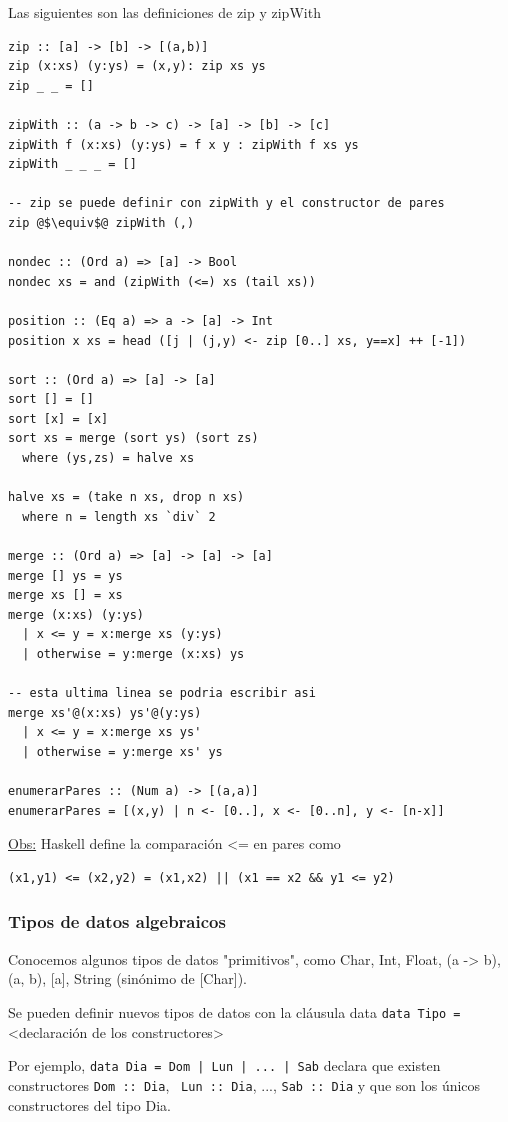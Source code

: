 \documentclass[12pt]{extarticle}
\def\observacion{\underline{Obs:} }
\newcommand\hsline[1]{\texttt{#1}}
\begin{document}
Las siguientes son las definiciones de zip y zipWith
\begin{verbatim}
zip :: [a] -> [b] -> [(a,b)]
zip (x:xs) (y:ys) = (x,y): zip xs ys
zip _ _ = []

zipWith :: (a -> b -> c) -> [a] -> [b] -> [c]
zipWith f (x:xs) (y:ys) = f x y : zipWith f xs ys
zipWith _ _ _ = []

-- zip se puede definir con zipWith y el constructor de pares
zip @$\equiv$@ zipWith (,)

nondec :: (Ord a) => [a] -> Bool
nondec xs = and (zipWith (<=) xs (tail xs))

position :: (Eq a) => a -> [a] -> Int
position x xs = head ([j | (j,y) <- zip [0..] xs, y==x] ++ [-1])

sort :: (Ord a) => [a] -> [a]
sort [] = []
sort [x] = [x]
sort xs = merge (sort ys) (sort zs)
  where (ys,zs) = halve xs

halve xs = (take n xs, drop n xs)
  where n = length xs `div` 2

merge :: (Ord a) => [a] -> [a] -> [a]
merge [] ys = ys
merge xs [] = xs
merge (x:xs) (y:ys)
  | x <= y = x:merge xs (y:ys)
  | otherwise = y:merge (x:xs) ys

-- esta ultima linea se podria escribir asi
merge xs'@(x:xs) ys'@(y:ys)
  | x <= y = x:merge xs ys'
  | otherwise = y:merge xs' ys

enumerarPares :: (Num a) -> [(a,a)]
enumerarPares = [(x,y) | n <- [0..], x <- [0..n], y <- [n-x]]
\end{verbatim}

\observacion Haskell define la comparación <= en pares como 
\begin{verbatim}
(x1,y1) <= (x2,y2) = (x1,x2) || (x1 == x2 && y1 <= y2)
\end{verbatim}

\subsubsection{Tipos de datos algebraicos}

Conocemos algunos tipos de datos "primitivos", como Char, Int, Float, (a -> b), (a, b), [a], String (sinónimo de [Char]).

Se pueden definir nuevos tipos de datos con la cláusula data
\hsline{data Tipo = }<declaración de los constructores>

Por ejemplo, \hsline{data Dia = Dom | Lun | ... | Sab} declara que existen constructores \hsline{Dom :: Dia}, \hsline{ Lun :: Dia}, ..., \hsline{Sab :: Dia} y que son los únicos constructores del tipo Dia.
\end{document}
